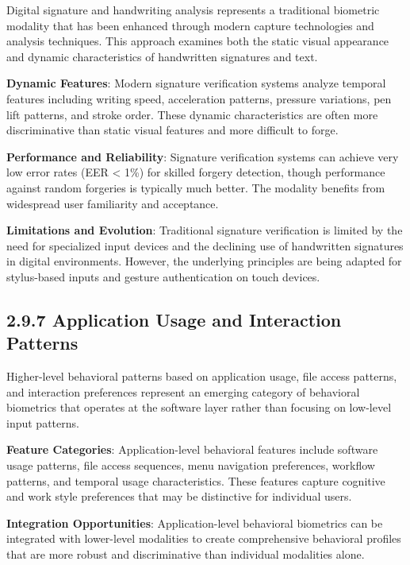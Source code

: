 \documentclass[
  12pt,
  a4paper,
]{report}
\begin{document}
Digital signature and handwriting analysis represents a traditional
biometric modality that has been enhanced through modern capture
technologies and analysis techniques. This approach examines both the
static visual appearance and dynamic characteristics of handwritten
signatures and text.

\textbf{Dynamic Features}: Modern signature verification systems analyze
temporal features including writing speed, acceleration patterns,
pressure variations, pen lift patterns, and stroke order. These dynamic
characteristics are often more discriminative than static visual
features and more difficult to forge.

\textbf{Performance and Reliability}: Signature verification systems can
achieve very low error rates (EER \textless{} 1\%) for skilled forgery
detection, though performance against random forgeries is typically much
better. The modality benefits from widespread user familiarity and
acceptance.

\textbf{Limitations and Evolution}: Traditional signature verification
is limited by the need for specialized input devices and the declining
use of handwritten signatures in digital environments. However, the
underlying principles are being adapted for stylus-based inputs and
gesture authentication on touch devices.

\subsection{2.9.7 Application Usage and Interaction
Patterns}\label{application-usage-and-interaction-patterns}

Higher-level behavioral patterns based on application usage, file access
patterns, and interaction preferences represent an emerging category of
behavioral biometrics that operates at the software layer rather than
focusing on low-level input patterns.

\textbf{Feature Categories}: Application-level behavioral features
include software usage patterns, file access sequences, menu navigation
preferences, workflow patterns, and temporal usage characteristics.
These features capture cognitive and work style preferences that may be
distinctive for individual users.

\textbf{Integration Opportunities}: Application-level behavioral
biometrics can be integrated with lower-level modalities to create
comprehensive behavioral profiles that are more robust and
discriminative than individual modalities alone.
\end{document}
